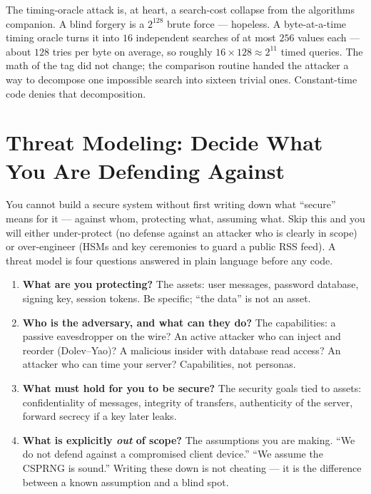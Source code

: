 \begin{connectionbox}
The timing-oracle attack is, at heart, a search-cost collapse from the algorithms
companion. A blind forgery is a $2^{128}$ brute force --- hopeless. A
byte-at-a-time timing oracle turns it into $16$ independent searches of at most
$256$ values each --- about $128$ tries per byte on average, so roughly
$16 \times 128 \approx 2^{11}$ timed queries. The math of the
tag did not change; the comparison routine handed the attacker a way to decompose
one impossible search into sixteen trivial ones. Constant-time code denies that
decomposition.
\end{connectionbox}

\section{Threat Modeling: Decide What You Are Defending Against}
\label{ch39:threat}

You cannot build a secure system without first writing down what ``secure'' means
for it --- against whom, protecting what, assuming what. Skip this and you will
either under-protect (no defense against an attacker who is clearly in scope) or
over-engineer (HSMs and key ceremonies to guard a public RSS feed). A threat model
is four questions answered in plain language before any code.

\begin{enumerate}
  \item \textbf{What are you protecting?} The assets: user messages, password
  database, signing key, session tokens. Be specific; ``the data'' is not an asset.
  \item \textbf{Who is the adversary, and what can they do?} The capabilities: a
  passive eavesdropper on the wire? An active attacker who can inject and reorder
  (Dolev--Yao)? A malicious insider with database read access? An attacker who can
  time your server? Capabilities, not personas.
  \item \textbf{What must hold for you to be secure?} The security goals tied to
  assets: confidentiality of messages, integrity of transfers, authenticity of the
  server, forward secrecy if a key later leaks.
  \item \textbf{What is explicitly \emph{out} of scope?} The assumptions you are
  making. ``We do not defend against a compromised client device.'' ``We assume the
  CSPRNG is sound.'' Writing these down is not cheating --- it is the difference
  between a known assumption and a blind spot.
\end{enumerate}

